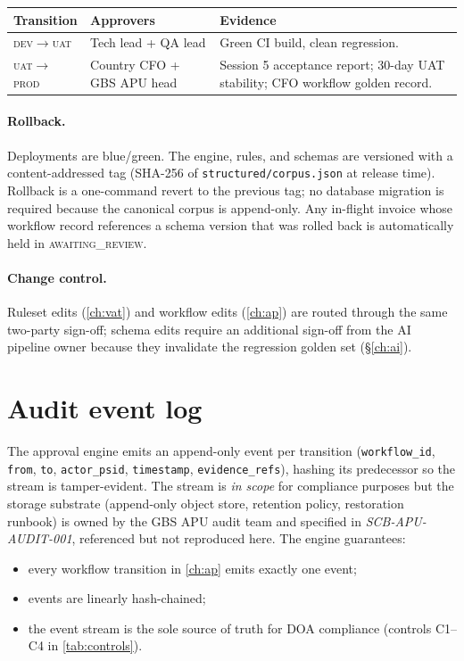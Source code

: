 \begin{tabularx}{\linewidth}{@{}l l X@{}}
\toprule
\textbf{Transition} & \textbf{Approvers} & \textbf{Evidence} \\ \midrule
\textsc{dev}$\to$\textsc{uat}  & Tech lead + QA lead           & Green CI build, clean regression. \\
\textsc{uat}$\to$\textsc{prod} & Country CFO + GBS APU head    & Session 5 acceptance report; 30-day UAT stability; CFO workflow golden record. \\
\bottomrule
\end{tabularx}

\paragraph{Rollback.} Deployments are blue/green. The engine, rules,
and schemas are versioned with a content-addressed tag (SHA-256 of
\texttt{structured/corpus.json} at release time). Rollback is a
one-command revert to the previous tag; no database migration is
required because the canonical corpus is append-only. Any in-flight
invoice whose workflow record references a schema version that was
rolled back is automatically held in \textsc{awaiting\_review}.

\paragraph{Change control.} Ruleset edits (\cref{ch:vat}) and
workflow edits (\cref{ch:ap}) are routed through the same two-party
sign-off; schema edits require an additional sign-off from the AI
pipeline owner because they invalidate the regression golden set
(\S\ref{ch:ai}).

\section{Audit event log}

The approval engine emits an append-only event per transition
(\texttt{workflow\_id}, \texttt{from}, \texttt{to},
\texttt{actor\_psid}, \texttt{timestamp}, \texttt{evidence\_refs}),
hashing its predecessor so the stream is tamper-evident. The stream
is \emph{in scope} for compliance purposes but the storage substrate
(append-only object store, retention policy, restoration runbook) is
owned by the GBS APU audit team and specified in
\emph{SCB-APU-AUDIT-001}, referenced but not reproduced here. The
engine guarantees:

\begin{itemize}
  \item every workflow transition in \cref{ch:ap} emits exactly one
        event;
  \item events are linearly hash-chained;
  \item the event stream is the sole source of truth for DOA
        compliance (controls C1--C4 in \cref{tab:controls}).
\end{itemize}
